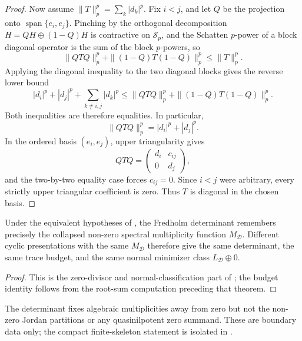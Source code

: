 \begin{proof}
  Now assume \(\|T\|_p^p=\sum_k|d_k|^p\).  Fix \(i<j\), and let \(Q\) be
  the projection onto \(\operatorname{span}\{e_i,e_j\}\).  Pinching by the
  orthogonal decomposition \(H=QH\oplus(1-Q)H\) is contractive on
  \(\mathcal S_p\), and the Schatten \(p\)-power of a block diagonal operator
  is the sum of the block \(p\)-powers, so
  \[
    \|QTQ\|_p^p+\|(1-Q)T(1-Q)\|_p^p\le \|T\|_p^p.
  \]
  Applying the diagonal inequality to the two diagonal blocks gives the reverse
  lower bound
  \[
    |d_i|^p+|d_j|^p+
    \sum_{k\ne i,j}|d_k|^p
    \le
    \|QTQ\|_p^p+\|(1-Q)T(1-Q)\|_p^p.
  \]
  Both inequalities are therefore equalities.  In particular,
  \[
    \|QTQ\|_p^p=|d_i|^p+|d_j|^p.
  \]
  In the ordered basis \((e_i,e_j)\), upper triangularity gives
  \[
    QTQ=\begin{pmatrix}d_i&c_{ij}\\0&d_j\end{pmatrix},
  \]
  and the two-by-two equality case forces \(c_{ij}=0\).  Since \(i<j\) were
  arbitrary, every strictly upper triangular coefficient is zero.  Thus \(T\)
  is diagonal in the chosen basis.
\end{proof}

\begin{corollary}
  \label{cor:trace-class-rigidity-consequences}
  \label{prop:collapsed-spectral-multiplicities}
  Under the equivalent hypotheses of
  , the Fredholm determinant remembers
  precisely the collapsed non-zero spectral multiplicity function
  \(M_{\mathcal D}\).  Different cyclic presentations with the same
  \(M_{\mathcal D}\) therefore give the same determinant, the same trace
  budget, and the same normal minimizer class \(L_{\mathcal D}\oplus0\).
\end{corollary}

\begin{proof}
  This is the zero-divisor and normal-classification part of
  ; the budget identity follows from the
  root-sum computation preceding that theorem.
\end{proof}

\begin{remark}
  \label{rem:nonnormal-obstruction-after-realization}
  The determinant fixes algebraic multiplicities away from zero but not the
  non-zero Jordan partitions or any quasinilpotent zero summand.  These are
  boundary data only; the compact finite-skeleton statement is isolated in
  .
\end{remark}

